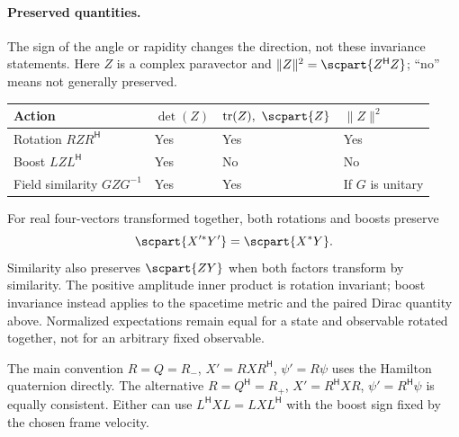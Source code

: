 \documentclass[11pt]{article}
\newcommand{\pv}[1]{{#1}}
\newcommand{\pvGreek}[1]{{#1}}
\newcommand{\pG}{\pv{G}}
\newcommand{\pL}{\pv{L}}
\newcommand{\pQ}{\pv{Q}}
\newcommand{\pR}{\pv{R}}
\newcommand{\pX}{\pv{X}}
\newcommand{\pY}{\pv{Y}}
\newcommand{\pZ}{\pv{Z}}
\newcommand{\pvpsi}{\pvGreek{\psi}}
\numberwithin{equation}{section}
\begin{document}
\paragraph{Preserved quantities.}
The sign of the angle or rapidity changes the direction, not these
invariance statements.  Here $\pZ$ is a complex paravector and
$\lVert \pZ\rVert^2=\scpart{\pZ^{\mathsf H}\pZ}$; ``no'' means not generally preserved.
\begin{center}
\begin{tabular}{@{}llll@{}}
\toprule
Action & $\det(\pZ)$ & $\operatorname{tr}(\pZ),\ \scpart {\pZ}$ & $\lVert \pZ\rVert^2$\\
\midrule
Rotation $\pR \pZ \pR^{\mathsf H}$ & Yes & Yes & Yes\\
Boost $\pL \pZ \pL^{\mathsf H}$ & Yes & No & No\\
Field similarity $\pG \pZ \pG^{-1}$ & Yes & Yes & If $\pG$ is unitary\\
\bottomrule
\end{tabular}
\end{center}
For real four-vectors transformed together, both rotations and boosts preserve
\[
 \scpart{\pX'^*\pY'}=\scpart{\pX^*\pY}.
\]
Similarity also preserves $\scpart{\pZ \pY}$ when both factors transform by
similarity.  The positive amplitude inner product is rotation invariant;
boost invariance instead applies to the spacetime metric and the paired
Dirac quantity above.  Normalized expectations remain equal for a state
and observable rotated together, not for an arbitrary fixed observable.

The main convention $\pR=\pQ=\pR_-$, $\pX'=\pR \pX \pR^{\mathsf H}$, $\pvpsi'=\pR\pvpsi$
uses the Hamilton quaternion directly.  The alternative
$\pR=\pQ^{\mathsf H}=\pR_+$, $\pX'=\pR^{\mathsf H}\pX \pR$, $\pvpsi'=\pR^{\mathsf H}\pvpsi$
is equally consistent.  Either can use $\pL^{\mathsf H}\pX \pL=\pL \pX \pL^{\mathsf H}$
with the boost sign fixed by the chosen frame velocity.
\end{document}
